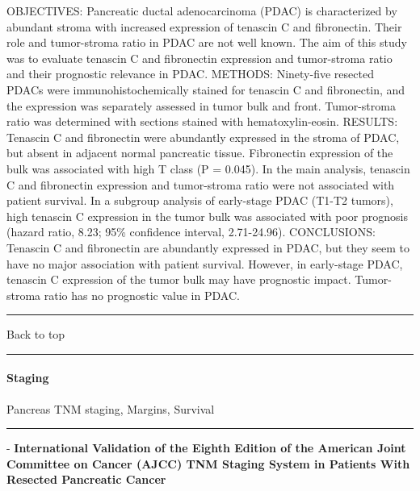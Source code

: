 \documentclass[]{article}
\let\oldparagraph\paragraph
\renewcommand{\paragraph}[1]{\oldparagraph{#1}\mbox{}}
\begin{document}
OBJECTIVES: Pancreatic ductal adenocarcinoma (PDAC) is characterized by
abundant stroma with increased expression of tenascin C and fibronectin.
Their role and tumor-stroma ratio in PDAC are not well known. The aim of
this study was to evaluate tenascin C and fibronectin expression and
tumor-stroma ratio and their prognostic relevance in PDAC. METHODS:
Ninety-five resected PDACs were immunohistochemically stained for
tenascin C and fibronectin, and the expression was separately assessed
in tumor bulk and front. Tumor-stroma ratio was determined with sections
stained with hematoxylin-eosin. RESULTS: Tenascin C and fibronectin were
abundantly expressed in the stroma of PDAC, but absent in adjacent
normal pancreatic tissue. Fibronectin expression of the bulk was
associated with high T class (P = 0.045). In the main analysis, tenascin
C and fibronectin expression and tumor-stroma ratio were not associated
with patient survival. In a subgroup analysis of early-stage PDAC (T1-T2
tumors), high tenascin C expression in the tumor bulk was associated
with poor prognosis (hazard ratio, 8.23; 95\% confidence interval,
2.71-24.96). CONCLUSIONS: Tenascin C and fibronectin are abundantly
expressed in PDAC, but they seem to have no major association with
patient survival. However, in early-stage PDAC, tenascin C expression of
the tumor bulk may have prognostic impact. Tumor-stroma ratio has no
prognostic value in PDAC.

{}

{}

\begin{center}\rule{0.5\linewidth}{\linethickness}\end{center}

Back to top

\begin{center}\rule{0.5\linewidth}{\linethickness}\end{center}

\pagebreak

\hypertarget{staging}{%
\paragraph{Staging}\label{staging}}

Pancreas TNM staging, Margins, Survival

\begin{center}\rule{0.5\linewidth}{\linethickness}\end{center}

 - \textbf{International Validation of the Eighth Edition of the
American Joint Committee on Cancer (AJCC) TNM Staging System in Patients
With Resected Pancreatic Cancer}
\end{document}
